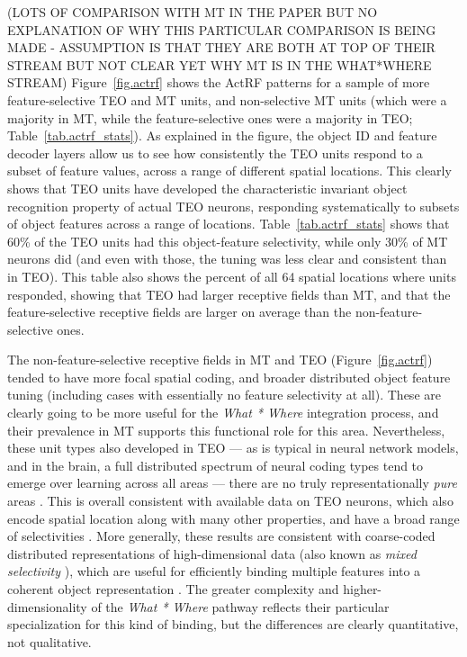 \documentclass[11pt,twoside]{article}
\newif\myifpdf
\begin{document}
(LOTS OF COMPARISON WITH MT IN THE PAPER BUT NO EXPLANATION OF WHY THIS PARTICULAR COMPARISON IS BEING MADE - ASSUMPTION IS THAT THEY ARE BOTH AT TOP OF THEIR STREAM BUT NOT CLEAR YET WHY MT IS IN THE WHAT*WHERE STREAM) Figure~\ref{fig.actrf} shows the ActRF patterns for a sample of more feature-selective TEO and MT units, and non-selective MT units (which were a majority in MT, while the feature-selective ones were a majority in TEO; Table~\ref{tab.actrf_stats}).  As explained in the figure, the object ID and feature decoder layers allow us to see how consistently the TEO units respond to a subset of feature values, across a range of different spatial locations.  This clearly shows that TEO units have developed the characteristic invariant object recognition property of actual TEO neurons, responding systematically to subsets of object features across a range of locations.  Table~\ref{tab.actrf_stats} shows that 60\% of the TEO units had this object-feature selectivity, while only 30\% of MT neurons did (and even with those, the tuning was less clear and consistent than in TEO).  This table also shows the percent of all 64 spatial locations where units responded, showing that TEO had larger receptive fields than MT, and that the feature-selective receptive fields are larger on average than the non-feature-selective ones.

The non-feature-selective receptive fields in MT and TEO (Figure~\ref{fig.actrf}) tended to have more focal spatial coding, and broader distributed object feature tuning (including cases with essentially no feature selectivity at all).  These are clearly going to be more useful for the {\em What * Where} integration process, and their prevalence in MT supports this functional role for this area.  Nevertheless, these unit types also developed in TEO --- as is typical in neural network models, and in the brain, a full distributed spectrum of neural coding types tend to emerge over learning across all areas --- there are no truly representationally {\em pure} areas \cite{BehrmannPlaut13}.  This is overall consistent with available data on TEO neurons, which also encode spatial location along with many other properties, and have a broad range of selectivities \cite[e.g.,]{HongYaminsMajajEtAl16,MajajHongSolomonEtAl15,ZoccolanKouhPoggioEtAl07,Tanaka96,LogothetisSheinberg96}.  More generally, these results are consistent with coarse-coded distributed representations of high-dimensional data (also known as {\em mixed selectivity} ), which are useful for efficiently binding multiple features into a coherent object representation \cite{HintonMcClellandRumelhart86,OReillyBusby02,OReillyBusbySoto03,CerOReilly06}.  The greater complexity and higher-dimensionality of the {\em What * Where} pathway reflects their particular specialization for this kind of binding, but the differences are clearly quantitative, not qualitative.
\end{document}
